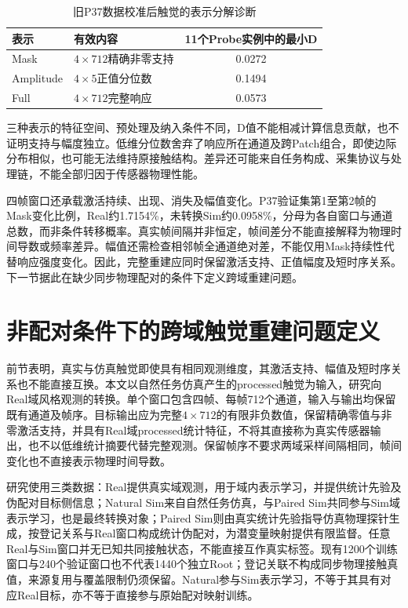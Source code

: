 \begin{table}[htbp]
 \centering\small
 \caption{旧P37数据校准后触觉的表示分解诊断}
 \label{tab:ch05_domain_feature_difference}
 \begin{tabular}{llc}
 \hline
 表示&有效内容&11个Probe实例中的最小D\\\hline
 Mask&$4\times712$精确非零支持&0.0272\\
 Amplitude&$4\times5$正值分位数&0.1494\\
 Full&$4\times712$完整响应&0.0573\\\hline
 \end{tabular}
\end{table}

三种表示的特征空间、预处理及纳入条件不同，D值不能相减计算信息贡献，也不证明支持与幅度独立。低维分位数舍弃了响应所在通道及跨Patch组合，即使边际分布相似，也可能无法维持原接触结构。差异还可能来自任务构成、采集协议与处理链，不能全部归因于传感器物理性能。

四帧窗口还承载激活持续、出现、消失及幅值变化。P37验证集第1至第2帧的Mask变化比例，Real约1.7154\%，未转换Sim约0.0958\%，分母为各自窗口与通道总数，而非条件转移概率。真实帧间隔并非恒定，帧间差分不能直接解释为物理时间导数或频率差异。幅值还需检查相邻帧全通道绝对差，不能仅用Mask持续性代替响应强度变化。因此，完整重建应同时保留激活支持、正值幅度及短时序关系。下一节据此在缺少同步物理配对的条件下定义跨域重建问题。



\section{非配对条件下的跨域触觉重建问题定义}
\label{sec:ch05_unpaired_problem}

前节表明，真实与仿真触觉即使具有相同观测维度，其激活支持、幅值及短时序关系也不能直接互换。本文以自然任务仿真产生的processed触觉为输入，研究向Real域风格观测的转换。单个窗口包含四帧、每帧712个通道，输入与输出均保留既有通道及帧序。目标输出应为完整$4\times712$的有限非负数值，保留精确零值与非零激活支持，并具有Real域processed统计特征，不将其直接称为真实传感器输出，也不以低维统计摘要代替完整观测。保留帧序不要求两域采样间隔相同，帧间变化也不直接表示物理时间导数。

研究使用三类数据：Real提供真实域观测，用于域内表示学习，并提供统计先验及伪配对目标侧信息；Natural Sim来自自然任务仿真，与Paired Sim共同参与Sim域表示学习，也是最终转换对象；Paired Sim则由真实统计先验指导仿真物理探针生成，按登记关系与Real窗口构成统计伪配对，为潜变量映射提供有限监督。任意Real与Sim窗口并无已知共同接触状态，不能直接互作真实标签。现有1200个训练窗口与240个验证窗口也不代表1440个独立Root；登记关联不构成同步物理接触真值，来源复用与覆盖限制仍须保留。Natural参与Sim表示学习，不等于其具有对应Real目标，亦不等于直接参与原始配对映射训练。


